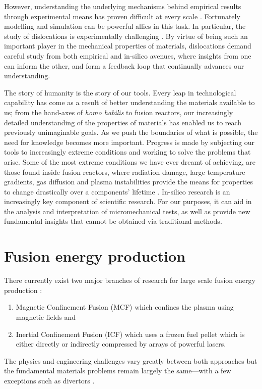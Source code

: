 However, understanding the underlying mechanisms behind empirical results through experimental means has proven difficult at every scale \cite{multiscale_model_mats1, multiscale_model_mats2}. Fortunately modelling and simulation can be powerful allies in this task. In particular, the study of dislocations is experimentally challenging \cite{dln_exp_obs1, dln_exp_obs2, dln_exp_obs3}. By virtue of being such an important player in the mechanical properties of materials, dislocations demand careful study from both empirical and in-silico avenues, where insights from one can inform the other, and form a feedback loop that continually advances our understanding.

The story of humanity is the story of our tools. Every leap in technological capability has come as a result of better understanding the materials available to us; from the hand-axes of \textit{homo habilis} to fusion reactors, our increasingly detailed understanding of the properties of materials has enabled us to reach previously unimaginable goals. As we push the boundaries of what is possible, the need for knowledge becomes more important. Progress is made by subjecting our tools to increasingly extreme conditions and working to solve the problems that arise. Some of the most extreme conditions we have ever dreamt of achieving, are those found inside fusion reactors, where radiation damage, large temperature gradients, gas diffusion and plasma instabilities provide the means for properties to change drastically over a components' lifetime \cite{fusmat1, mats_fusion1, mats_fusion2}. In-silico research is an increasingly key component of scientific research. For our purposes, it can aid in the analysis and interpretation of micromechanical tests, as well as provide new fundamental insights that cannot be obtained via traditional methods.

\section{Fusion energy production}
\label{s:fusion}

There currently exist two major branches of research for large scale fusion energy production \cite{icfvsmcf,betti2010thermonuclear}:
\begin{enumerate}
    \item Magnetic Confinement Fusion (MCF) \cite{mcf} which confines the plasma using magnetic fields and
    \item Inertial Confinement Fusion (ICF) \cite{icf} which uses a frozen fuel pellet which is either directly or indirectly compressed by arrays of powerful lasers.
\end{enumerate}
The physics and engineering challenges vary greatly between both approaches but the fundamental materials problems remain largely the same---with a few exceptions such as divertors \cite{icf_mcf1, icf_mcf2}.

